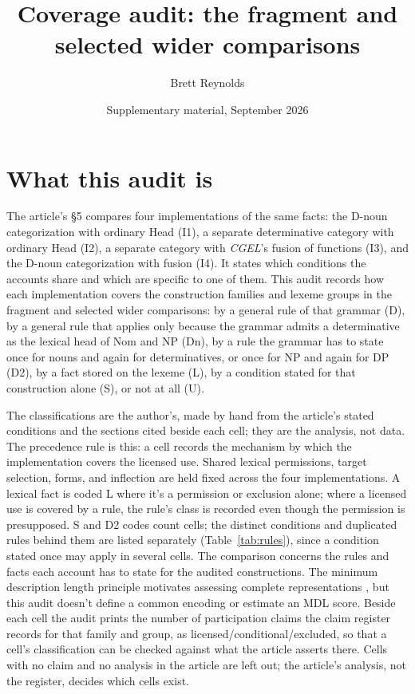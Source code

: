 \documentclass[12pt]{article}
\title{Coverage audit: the fragment and selected wider comparisons}
\author{Brett Reynolds}
\date{Supplementary material, September 2026}
\begin{document}
\maketitle

\section{What this audit is}

The article's §5 compares four implementations of the same facts: the D-noun categorization with ordinary Head (I1), a separate determinative category with ordinary Head (I2), a separate category with \textit{CGEL}'s fusion of functions (I3), and the D-noun categorization with fusion (I4). It states which conditions the accounts share and which are specific to one of them. This audit records how each implementation covers the construction families and lexeme groups in the fragment and selected wider comparisons: by a general rule of that grammar (D), by a general rule that applies only because the grammar admits a determinative as the lexical head of Nom and NP (Dn), by a rule the grammar has to state once for nouns and again for determinatives, or once for NP and again for DP (D2), by a fact stored on the lexeme (L), by a condition stated for that construction alone (S), or not at all (U).

The classifications are the author's, made by hand from the article's stated conditions and the sections cited beside each cell; they are the analysis, not data. The precedence rule is this: a cell records the mechanism by which the implementation covers the licensed use. Shared lexical permissions, target selection, forms, and inflection are held fixed across the four implementations. A lexical fact is coded L where it's a permission or exclusion alone; where a licensed use is covered by a rule, the rule's class is recorded even though the permission is presupposed. S and D2 codes count cells; the distinct conditions and duplicated rules behind them are listed separately (Table~\ref{tab:rules}), since a condition stated once may apply in several cells. The comparison concerns the rules and facts each account has to state for the audited constructions. The minimum description length principle motivates assessing complete representations \citep{rissanen1978mdl}, but this audit doesn't define a common encoding or estimate an MDL score. Beside each cell the audit prints the number of participation claims the claim register records for that family and group, as licensed/conditional/excluded, so that a cell's classification can be checked against what the article asserts there. Cells with no claim and no analysis in the article are left out; the article's analysis, not the register, decides which cells exist.
\end{document}
